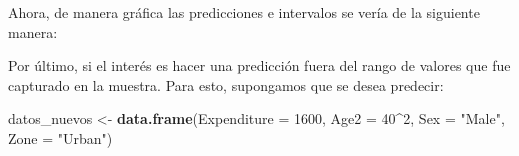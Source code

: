 \documentclass[
  12pt,
]{book}
\newenvironment{Shaded}{\begin{snugshade}}{\end{snugshade}}
\newcommand{\AttributeTok}[1]{\textcolor[rgb]{0.13,0.29,0.53}{#1}}
\newcommand{\DataTypeTok}[1]{\textcolor[rgb]{0.13,0.29,0.53}{#1}}
\newcommand{\DecValTok}[1]{\textcolor[rgb]{0.00,0.00,0.81}{#1}}
\newcommand{\FloatTok}[1]{\textcolor[rgb]{0.00,0.00,0.81}{#1}}
\newcommand{\FunctionTok}[1]{\textcolor[rgb]{0.13,0.29,0.53}{\textbf{#1}}}
\newcommand{\NormalTok}[1]{#1}
\newcommand{\OtherTok}[1]{\textcolor[rgb]{0.56,0.35,0.01}{#1}}
\newcommand{\SpecialCharTok}[1]{\textcolor[rgb]{0.81,0.36,0.00}{\textbf{#1}}}
\newcommand{\StringTok}[1]{\textcolor[rgb]{0.31,0.60,0.02}{#1}}
\begin{document}
Ahora, de manera gráfica las predicciones e intervalos se vería de la siguiente manera:

\begin{Shaded}
\end{Shaded}

Por último, si el interés es hacer una predicción fuera del rango de valores que fue capturado en la muestra. Para esto, supongamos que se desea predecir:

\begin{Shaded}
\begin{Highlighting}[]
\NormalTok{datos\_nuevos }\OtherTok{\textless{}{-}} \FunctionTok{data.frame}\NormalTok{(}\AttributeTok{Expenditure =} \DecValTok{1600}\NormalTok{,}
                           \AttributeTok{Age2 =} \DecValTok{40}\SpecialCharTok{\^{}}\DecValTok{2}\NormalTok{, }\AttributeTok{Sex =} \StringTok{"Male"}\NormalTok{,}
                           \AttributeTok{Zone =} \StringTok{"Urban"}\NormalTok{)}
\end{Highlighting}
\end{Shaded}
\end{document}
